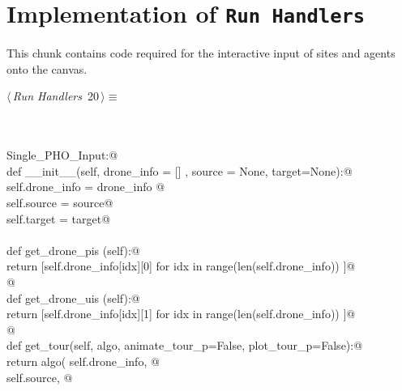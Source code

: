 \documentclass[12pt, english, oneside]{report}
\begin{document}
\begin{appendices}
\begin{flushleft}
\begin{list}{}{\setlength{\itemsep}{-\parsep}\setlength{\itemindent}{-\leftmargin}}
\item{}
\end{list}
\vspace{4ex}
\end{flushleft}

\chapter{Implementation of \textlangle \texttt{Run Handlers}\textrangle}

This chunk contains code required for the interactive input of sites and agents onto the canvas. 

\begin{flushleft} \small\label{scrap5}\raggedright\small
{} $\langle\,${\itshape Run Handlers}\nobreak\ {\footnotesize {20}}$\,\rangle\equiv$
\vspace{-1ex}
\begin{list}{}{} \item
\mbox{}\verb@@\\
\mbox{}\verb@@\\
\mbox{}\verb@class Single_PHO_Input:@\\
\mbox{}\verb@    def __init__(self, drone_info = [] , source = None, target=None):@\\
\mbox{}\verb@           self.drone_info = drone_info @\\
\mbox{}\verb@           self.source     = source@\\
\mbox{}\verb@           self.target     = target@\\
\mbox{}\verb@@\\
\mbox{}\verb@    def get_drone_pis (self):@\\
\mbox{}\verb@           return [self.drone_info[idx][0] for idx in range(len(self.drone_info)) ]@\\
\mbox{}\verb@           @\\
\mbox{}\verb@    def get_drone_uis (self):@\\
\mbox{}\verb@           return [self.drone_info[idx][1] for idx in range(len(self.drone_info)) ]@\\
\mbox{}\verb@         @\\
\mbox{}\verb@    def get_tour(self, algo, animate_tour_p=False, plot_tour_p=False):@\\
\mbox{}\verb@           return algo( self.drone_info, @\\
\mbox{}\verb@                        self.source, @\\

\end{list}
\end{flushleft}
\end{appendices}
\end{document}
